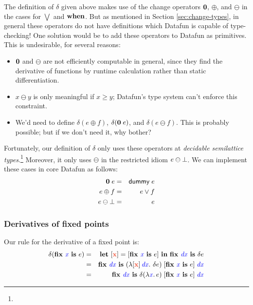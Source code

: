 \documentclass{article}
\newcommand{\dummy}{\ms{dummy}}
\begin{document}
The definition of $\delta$ given above makes use of the change operators $\mathbf{0}$, $\oplus$, and $\ominus$ in the cases for $\bigvee$ and $\mathbf{when}$.
%
But as mentioned in Section \ref{sec:change-types}, in general these operators do not have definitions which Datafun is capable of type-checking!
%
One solution would be to add these operators to Datafun as primitives.
%
This is undesirable, for several reasons:
\begin{itemize}
\item $\mathbf{0}$ and $\ominus$ are not efficiently computable in general, since
  they find the derivative of functions by runtime calculation rather than
  static differentiation.

\item $x \ominus y$ is only meaningful if $x \ge y$; Datafun's type system
  can't enforce this constraint.

\item We'd need to define $\delta(e \oplus f)$, $\delta(\mathbf{0}\;e)$, and
  $\delta(e \ominus f)$. This is probably possible; but if we don't need it, why
  bother?
\end{itemize}

Fortunately, our definition of $\delta$ only uses these operators at \emph{decidable semilattice types}.\footnote{} Moreover, it only uses $\ominus$ in the restricted idiom $e \ominus \bot$. We can implement these cases in core Datafun as follows:
%
\begin{eqnarray*}
  \zero\; e &=& \dummy\; e\\
  e \oplus f &=& e \vee f\\
  e \ominus \unit &=& e
\end{eqnarray*}



\subsubsection{Derivatives of fixed points}

Our rule for the derivative of a fixed point is:
\begin{eqnarray*}
  \delta(\fix{\m{x}} e)
  &=& \letdisc{\d{x}}{\disc{\fix{\m{x}} e}} \fix{\m{dx}} \delta e\\
  &=& \fix{\m{dx}}
      (\fn \disc{\d{x}}\, \m{dx}\binder\, \delta e)
      \; \disc{\fix{\m{x}} e}
      \; \m{dx}\\
  &=& \fix{\m{dx}} \delta(\lam{\m{x}} e)
      \; \disc{\fix{\m{x}} e}
      \; \m{dx}
\end{eqnarray*}
\end{document}
